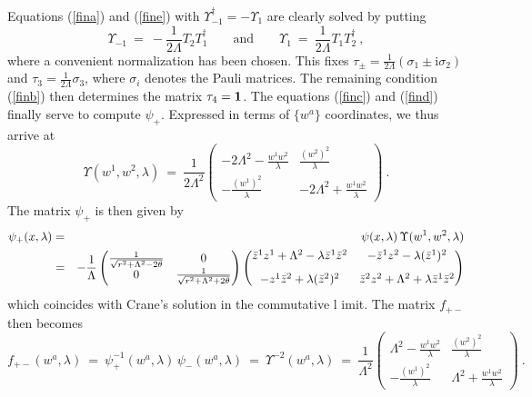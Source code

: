 \documentclass[a4paper,11pt,english]{article}
\numberwithin{equation}{section}
\newcommand{\sfrac}[2]{{\textstyle\frac{#1}{#2}}}
\newcommand{\ii}{\mbox{i}}
\renewcommand{\=}{\ =\ }
\begin{document}
Equations (\ref{fina}) and (\ref{fine}) with 
$\Upsilon_{-1}^\dagger=-\Upsilon_1$ are clearly solved by putting
\begin{equation}
\Upsilon_{-1}\=-\sfrac{1}{2\Lambda}T_2T_1^\dagger \qquad\text{and}\qquad
\Upsilon_1   \= \sfrac{1}{2\Lambda}T_1T_2^\dagger\ ,
\end{equation}
where a convenient normalization has been chosen.
This fixes $\tau_\pm=\sfrac{1}{2\Lambda}(\sigma_1\pm\ii\sigma_2)$ and
$\tau_3=\sfrac{1}{2\Lambda}\sigma_3$, where $\sigma_i$ denotes
the Pauli matrices. The remaining condition (\ref{finb}) then
determines the matrix $\tau_4={\bf1}$. The equations (\ref{finc})
and (\ref{find}) finally serve to compute $\psi_+$.
Expressed in terms of $\{w^a\}$ coordinates, we thus arrive at
\begin{equation}
 \Upsilon(w^1,w^2,\lambda)\=\frac{1}{2\Lambda^2}
                    \begin{pmatrix} {\scriptstyle -2\Lambda^2-}\frac{w^1w%
^2}{\lambda} & \frac{(w^2)^2}{\lambda}\\[8pt]
                                    {\scriptstyle -}\frac{(w^1)^2}{\lambda} &
 {\scriptstyle -2\Lambda^2+}\frac{w^1w^2}{\lambda}
                    \end{pmatrix}\ .
\end{equation}
The matrix $\psi_+$ is then given by
\begin{eqnarray}
 \psi_+(x,\lambda) &=& \psi(x,\lambda)\, \Upsilon(w^1,w^2,\lambda)\notag\\
                 &=& -\frac{1}{\Lambda}\begin{pmatrix} \frac{1}{\sqrt{r%
^2+\Lambda^2-2\theta}} & 0\\
                                                                    0 & 
\frac{1}{\sqrt{r^2+\Lambda^2+2\theta}}
                                                    \end{pmatrix}
                 \begin{pmatrix} \bar{z}^1z^1+\Lambda^2-\lambda \bar{z}^1%
\bar{z}^2 & -\bar{z}^1z^2-\lambda(\bar{z}^1)^2\\[8pt]
                                 -z^1\bar{z}^2+\lambda(\bar{z}^2)^2 & 
\bar{z}^2z^2+\Lambda^2+\lambda\bar{z}^1\bar{z}^2
                 \end{pmatrix}
\end{eqnarray}
which coincides with Crane's solution \cite{Crane:im} in the commutative l%
imit. The matrix $f_{+-}$ then becomes
\begin{equation}
 f_{+-}(w^a,\lambda)\=\psi^{-1}_+(w^a,\lambda)\,\psi_-(w^a,\lambda)
\=\Upsilon^{-2}(w^a,\lambda)\=\frac{1}{\Lambda^2}
   \begin{pmatrix} {\scriptstyle \Lambda^2-}\frac{w^1w^2}{\lambda} & 
                   \frac{(w^2)^2}{\lambda}\\[8pt]
                   {\scriptstyle -}\frac{(w^1)^2}{\lambda} & 
                   {\scriptstyle \Lambda^2+}\frac{w^1w^2}{\lambda}
   \end{pmatrix}\ .
\end{equation}
\end{document}
